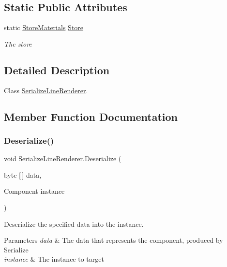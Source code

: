 \subsection*{Static Public Attributes}
\begin{DoxyCompactItemize}
\item 
static \hyperlink{class_serialization_1_1_store_materials}{Store\+Materials} \hyperlink{class_serialize_line_renderer_a77fab02d27de2b02dedda9798e2b6170}{Store}
\begin{DoxyCompactList}\small\item\em The store \end{DoxyCompactList}\end{DoxyCompactItemize}


\subsection{Detailed Description}
Class \hyperlink{class_serialize_line_renderer}{Serialize\+Line\+Renderer}. 



\subsection{Member Function Documentation}
\mbox{\label{class_serialize_line_renderer_ae925ea66d21c259c560d2cbe5ccb762b}} 
\subsubsection{\texorpdfstring{Deserialize()}{Deserialize()}}
{\footnotesize\ttfamily void Serialize\+Line\+Renderer.\+Deserialize (\begin{DoxyParamCaption}\item[{byte \mbox{[}$\,$\mbox{]}}]{data,  }\item[{Component}]{instance }\end{DoxyParamCaption})\hspace{0.3cm}{\ttfamily [inline]}}



Deserialize the specified data into the instance. 


\begin{DoxyParams}{Parameters}
{\em data} & The data that represents the component, produced by Serialize\\
\hline
{\em instance} & The instance to target\\
\hline
\end{DoxyParams}


